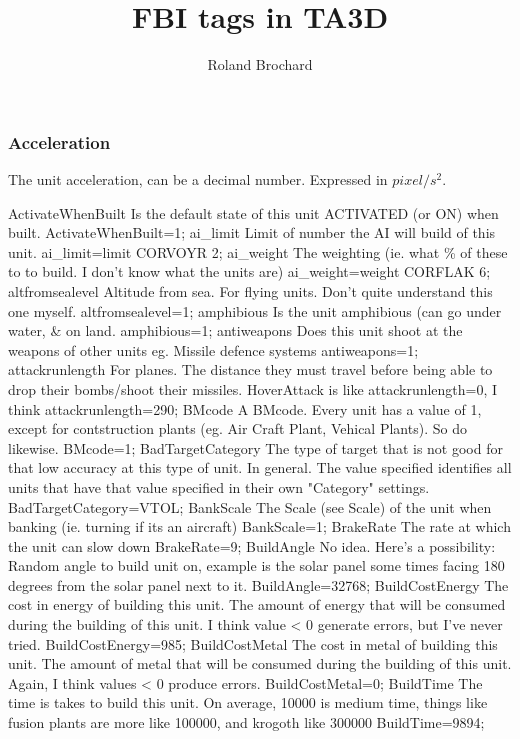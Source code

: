 \documentclass[a4paper,10pt]{article}
\title{FBI tags in TA3D}
\author{Roland Brochard}
\date{}
\begin{document}
\maketitle

\subsubsection{Acceleration}
The unit acceleration, can be a decimal number. Expressed in $pixel/s^2$.

ActivateWhenBuilt 	Is the default state of this unit ACTIVATED (or ON) when built. 	ActivateWhenBuilt=1;
ai\_limit 	Limit of number the AI will build of this unit. 	ai\_limit=limit CORVOYR 2;
ai\_weight 	The weighting (ie. what \% of these to to build. I don't know what the units are) 	ai\_weight=weight CORFLAK 6;
altfromsealevel 	Altitude from sea. For flying units. Don't quite understand this one myself. 	altfromsealevel=1;
amphibious 	Is the unit amphibious (can go under water, \& on land. 	amphibious=1;
antiweapons 	Does this unit shoot at the weapons of other units eg. Missile defence systems 	antiweapons=1;
attackrunlength 	For planes. The distance they must travel before being able to drop their bombs/shoot their missiles. HoverAttack is like attackrunlength=0, I think 	attackrunlength=290;
BMcode 	A BMcode. Every unit has a value of 1, except for contstruction plants (eg. Air Craft Plant, Vehical Plants). So do likewise. 	BMcode=1;
BadTargetCategory 	The type of target that is not good for that low accuracy at this type of unit. In general.  The value specified identifies all units that have that value specified in their own "Category" settings. 	BadTargetCategory=VTOL;
BankScale 	The Scale (see Scale) of the unit when banking (ie. turning if its an aircraft) 	BankScale=1;
BrakeRate 	The rate at which the unit can slow down 	BrakeRate=9;
BuildAngle 	No idea. Here's a possibility:  Random angle to build unit on, example is the solar panel some times facing 180 degrees from the solar panel next to it.  	BuildAngle=32768;
BuildCostEnergy 	The cost in energy of building this unit.  The amount of energy that will be consumed during the building of this unit. I think value < 0 generate errors, but I've never tried.   	BuildCostEnergy=985;
BuildCostMetal 	The cost in metal of building this unit.  The amount of metal that will be consumed during the building of this unit. Again, I think values < 0 produce errors.   	BuildCostMetal=0;
BuildTime 	The time is takes to build this unit. On average, 10000 is medium time, things like fusion plants are more like 100000, and krogoth like 300000 	BuildTime=9894;
\end{document}
